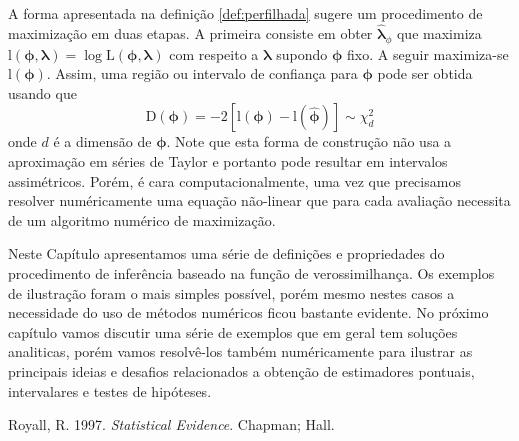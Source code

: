 \documentclass[
  9pt,
  a5paper,
]{book}
\newlength{\cslhangindent}
\newlength{\cslentryspacingunit} %
\newenvironment{CSLReferences}[2] %
 {%
  \setlength{\parindent}{0pt}
  \ifodd #1
  \let\oldpar\par
  \def\par{\hangindent=\cslhangindent\oldpar}
  \fi
  \setlength{\parskip}{#2\cslentryspacingunit}
 }%
 {}
\theoremstyle{definition}
\theoremstyle{definition}
\theoremstyle{definition}
\theoremstyle{definition}
\theoremstyle{remark}
\begin{document}
A forma apresentada na definição \ref{def:perfilhada} sugere um procedimento de maximização em duas etapas. A primeira consiste em obter \(\hat{\boldsymbol{\lambda}}_{\phi}\) que maximiza \(\mathrm{l}(\boldsymbol{\phi}, \boldsymbol{\lambda}) = \log \mathrm{L}(\boldsymbol{\phi}, \boldsymbol{\lambda})\) com respeito a \(\boldsymbol{\lambda}\) supondo \(\boldsymbol{\phi}\) fixo.
A seguir maximiza-se \(\mathrm{l}(\boldsymbol{\phi})\). Assim, uma região ou intervalo de confiança para \(\boldsymbol{\phi}\) pode ser obtida usando que
\[ 
\mathrm{D}(\boldsymbol{\phi}) = -2[\mathrm{l}(\boldsymbol{\phi})-\mathrm{l}(\hat{\boldsymbol{\phi}})] \sim \chi^2_d
\]
onde \(d\) é a dimensão de \(\boldsymbol{\phi}\). Note que esta forma de construção não usa a aproximação em séries de Taylor e portanto pode resultar em intervalos assimétricos. Porém, é cara computacionalmente, uma vez que precisamos resolver numéricamente uma equação não-linear que para cada avaliação necessita de um algoritmo numérico de maximização.

Neste Capítulo apresentamos uma série de definições e propriedades do procedimento de inferência baseado na função de verossimilhança. Os exemplos de ilustração foram o mais simples possível, porém mesmo nestes casos a necessidade do uso de métodos numéricos ficou bastante evidente. No próximo capítulo vamos discutir uma série de exemplos que em geral tem soluções analiticas, porém vamos resolvê-los também numéricamente para ilustrar as principais ideias e desafios relacionados a obtenção de estimadores pontuais, intervalares e testes de hipóteses.

\hypertarget{refs}{}
\begin{CSLReferences}{1}{0}
\leavevmode{}%
Royall, R. 1997. \emph{Statistical Evidence}. Chapman; Hall.

\end{CSLReferences}
\end{document}
